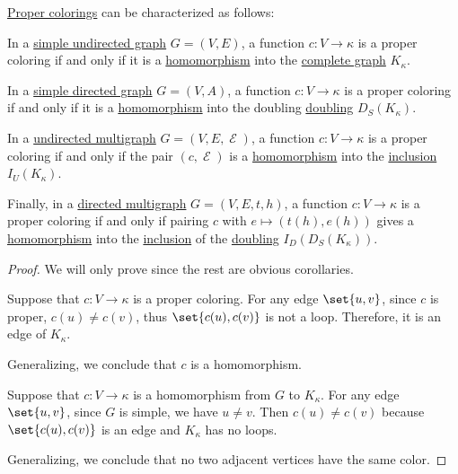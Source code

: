 \begin{proposition}\label{thm:graph_coloring_as_homomorphism}
  \hyperref[def:graph_coloring/proper]{Proper colorings} can be characterized as follows:

  \begin{thmenum}
     In a \hyperref[def:undirected_graph]{simple undirected graph} \( G = (V, E) \), a function \( c: V \to \kappa \) is a proper coloring if and only if it is a \hyperref[def:undirected_graph/homomorphism]{homomorphism} into the \hyperref[def:complete_graph]{complete graph} \( K_\kappa \).

     In a \hyperref[def:directed_graph]{simple directed graph} \( G = (V, A) \), a function \( c: V \to \kappa \) is a proper coloring if and only if it is a \hyperref[def:directed_graph/homomorphism]{homomorphism} into the doubling \hyperref[def:graph_functors/simple_doubling]{doubling} \( D_S(K_\kappa) \).

     In a \hyperref[def:undirected_multigraph]{undirected multigraph} \( G = (V, E, \mscrE) \), a function \( c: V \to \kappa \) is a proper coloring if and only if the pair \( (c, \mscrE) \) is a \hyperref[def:undirected_multigraph/homomorphism]{homomorphism} into the \hyperref[def:graph_functors/undirected_inclusion]{inclusion} \( I_U(K_\kappa) \).

     Finally, in a \hyperref[def:directed_multigraph]{directed multigraph} \( G = (V, E, t, h) \), a function \( c: V \to \kappa \) is a proper coloring if and only if pairing \( c \) with \( e \mapsto (t(h), e(h)) \) gives a \hyperref[def:directed_multigraph/homomorphism]{homomorphism} into the \hyperref[def:graph_functors/directed_inclusion]{inclusion} of the \hyperref[def:graph_functors/simple_doubling]{doubling} \( I_D(D_S(K_\kappa)) \).
  \end{thmenum}
\end{proposition}
\begin{proof}
  We will only prove  since the rest are obvious corollaries.

  \SufficiencySubProof Suppose that \( c: V \to \kappa \) is a proper coloring. For any edge \( \set{ u, v } \), since \( c \) is proper, \( c(u) \neq c(v) \), thus \( \set{ c(u), c(v) } \) is not a loop. Therefore, it is an edge of \( K_\kappa \).

  Generalizing, we conclude that \( c \) is a homomorphism.

  \NecessitySubProof Suppose that \( c: V \to \kappa \) is a homomorphism from \( G \) to \( K_\kappa \). For any edge \( \set{ u, v } \), since \( G \) is simple, we have \( u \neq v \). Then \( c(u) \neq c(v) \) because \( \set{ c(u), c(v) } \) is an edge and \( K_\kappa \) has no loops.

  Generalizing, we conclude that no two adjacent vertices have the same color.
\end{proof}

